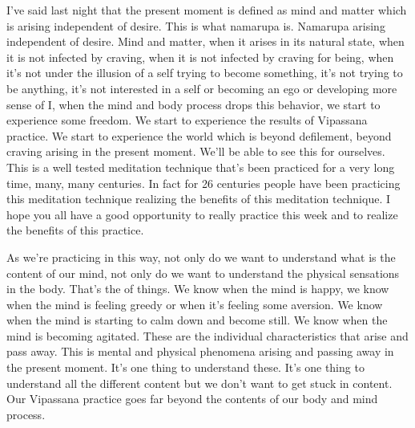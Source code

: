 \documentclass[letterpaper,10pt,english]{sphinxmanual}
\begin{document}
\sphinxAtStartPar
I’ve  said  last  night  that  the  present  moment  is  defined  as  mind  and
matter  which  is  arising  independent  of  desire.  This  is  what  nama\sphinxhyphen{}rupa  is.
Nama\sphinxhyphen{}rupa arising independent of desire. Mind and matter, when it arises
in its natural state, when it is not infected by craving, when it is not infected
by  craving  for  being,  when  it’s  not  under  the  illusion  of  a  self  trying  to
become  something,  it’s  not  trying  to  be  anything,  it’s  not  interested  in  a
self or becoming an ego or developing more sense of I, when the mind and
body process drops this behavior, we start to experience some freedom. We
start to experience the results of Vipassana practice. We start to experience
the world which is beyond defilement, beyond craving arising in the present  moment.  We’ll  be  able  to  see  this  for  ourselves.  This  is  a  well  tested
meditation technique that’s been practiced for a very long time, many, many
centuries. In fact for 26 centuries people have been practicing this meditation technique realizing the benefits of this meditation technique. I hope you
all have a good opportunity to really practice this week and to realize the
benefits of this practice.

\sphinxAtStartPar
As  we’re  practicing  in  this  way,  not  only  do  we  want  to  understand
what is the content of our mind, not only do we want to understand the physical sensations in the body. That’s the
of things. We
know when the mind is happy, we know when the mind is feeling greedy or
  when it’s feeling some aversion. We know when the mind is starting to calm
down and become still. We know when the mind is becoming agitated. These
are the individual characteristics that arise and pass away. This is mental and
physical  phenomena  arising  and  passing  away  in  the  present  moment.  It’s
one thing to understand these. It’s one thing to understand all the different
content but we don’t want to get stuck in content. Our Vipassana practice
goes far beyond the contents of our body and mind process.
\end{document}
